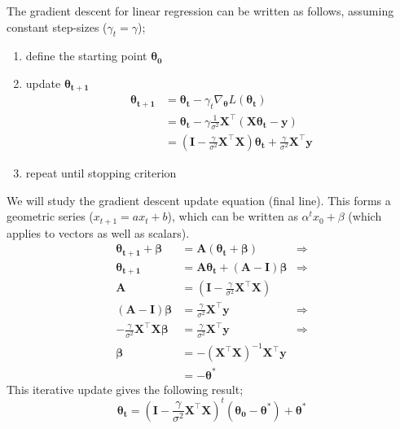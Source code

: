\documentclass[a4paper, 12pt]{article}
\newcommand{\mat}[1]{\boldsymbol{#1}}
\renewcommand{\vec}[1]{\boldsymbol{#1}}
\begin{document}
            The gradient descent for linear regression can be written as follows, assuming constant step-sizes ($\gamma_t = \gamma$);
            \begin{enumerate}[1.]
                \itemsep0em
                \item define the starting point $\mat{\theta_0}$
                \item update $\mat{\theta_{t + 1}}$
                    \begin{align*}
                        \mat{\theta_{t + 1}} & = \mat{\theta_t} - \gamma_t \nabla_{\mat{\theta}}L(\vec{\theta_t}) \\
                        & = \mat{\theta_t} - \gamma\frac{1}{\sigma^2} \mat{X}^\top(\mat{X}\mat{\theta_t} - \mat{y}) \\
                        & = (\mat{I} - \frac{\gamma}{\sigma^2}\mat{X}^\top\mat{X})\mat{\theta_t} + \frac{\gamma}{\sigma^2}\mat{X}^\top\mat{y}
                    \end{align*}
                \item repeat until stopping criterion
            \end{enumerate}
            We will study the gradient descent update equation (final line).
            This forms a geometric series ($x_{t + 1} = a x_t + b$), which can be written as $\alpha^t x_0 + \beta$ (which applies to vectors as well as scalars).
            \begin{align*}
                \mat{\theta_{t + 1}} + \mat{\beta} & = \mat{A}(\mat{\theta_t} + \mat{\beta}) & \Rightarrow \\
                \mat{\theta_{t + 1}} & = \mat{A}\mat{\theta_t} + (\mat{A} - \mat{I})\mat{\beta} & \Rightarrow \\
                \mat{A} & = (\mat{I} - \frac{\gamma}{\sigma^2}\mat{X}^\top\mat{X}) \\
                (\mat{A} - \mat{I})\mat{\beta} & = \frac{\gamma}{\sigma^2}\mat{X}^\top\mat{y} & \Rightarrow \\
                -\frac{\gamma}{\sigma^2}\mat{X}^\top\mat{X}\mat{\beta} & = \frac{\gamma}{\sigma^2}\mat{X}^\top\mat{y} & \Rightarrow \\
                \mat{\beta} & = -(\mat{X}^\top\mat{X})^{-1}\mat{X}^\top\mat{y} \\
                & = -\mat{\theta^*}
            \end{align*}
            This iterative update gives the following result;
            $$\mat{\theta_t} = (\mat{I} - \frac{\gamma}{\sigma^2}\mat{X}^\top\mat{X})^t(\mat{\theta_0} - \mat{\theta^*}) + \mat{\theta^*}$$
\end{document}
